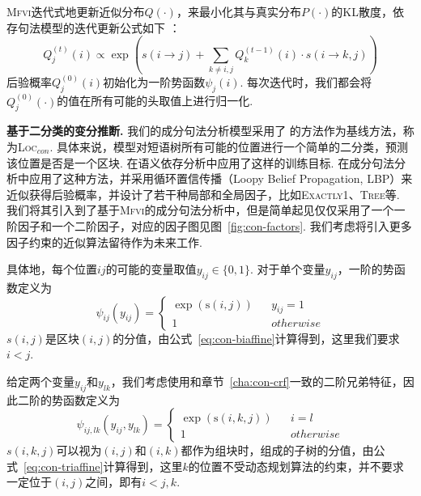 \textsc{Mfvi}迭代式地更新近似分布$Q(\cdot)$，来最小化其与真实分布$P(\cdot)$的KL散度，依存句法模型的迭代更新公式如下 \citep{wang-tu-2020-second}：
\begin{equation}
  \label{eq:mfvi-dep}
  Q_{j}^{(t)}(i)\propto \exp\left(s(i\rightarrow j) +\sum_{k\neq i,j} Q_{k}^{(t-1)}(i)\cdot s(i\rightarrow {k,j}) \right)
\end{equation}
后验概率$Q_j^{(0)}(i)$初始化为一阶势函数$\psi_j(i)$.
每次迭代时，我们都会将$Q_j^{(0)}(\cdot)$的值在所有可能的头取值上进行归一化.

\noindent\textbf{基于二分类的变分推断.}
我们的成分句法分析模型采用了 \citep{gaddy-etal-2018-whats}的方法作为基线方法，称为\textsc{Loc}$_{con}$.
具体来说，模型对短语树所有可能的位置进行一个简单的二分类，预测该位置是否是一个区块.
\citep{dozat-manning-2018-simpler,wang-etal-2019-second}在语义依存分析中应用了这样的训练目标.
\citep{gormley-eisner-2015-structured,naradowsky-etal-2012-grammarless}在成分句法分析中应用了这种方法，并采用循环置信传播（Loopy Belief Propagation, LBP）来近似获得后验概率，并设计了若干种局部和全局因子，比如\textsc{Exactly1}、\textsc{Tree}等.
我们将其引入到了基于\textsc{Mfvi}的成分句法分析中，但是简单起见仅仅采用了一个一阶因子和一个二阶因子，对应的因子图见图~\ref{fig:con-factors}.
我们考虑将引入更多因子约束的近似算法留待作为未来工作.


具体地，每个位置$ij$的可能的变量取值$y_{ij}\in \{0,1\}$. 对于单个变量$y_{ij}$，一阶的势函数定义为
\begin{equation}
  \label{eq:con-1o-potential}
  \psi_{ij}(y_{ij})=\left\{
  \begin{array}{rcl}
    \exp\left(\mathrm{s}(i,j)\right) &  & {y_{ij}=1}  \\
    1                                &  & {otherwise}
  \end{array}
  \right.
\end{equation}
$s(i,j)$是区块$(i,j)$的分值，由公式~\ref{eq:con-biaffine}计算得到，这里我们要求$i<j$.

给定两个变量$y_{ij}$和$y_{lk}$，我们考虑使用和章节~\ref{cha:con-crf}一致的二阶兄弟特征，因此二阶的势函数定义为
\begin{equation}
  \label{eq:2o-con-potential}
  \psi_{ij,lk}(y_{ij},y_{lk})=\left\{
  \begin{array}{rcl}
    \exp\left(\mathrm{s}(i,k,j)\right) &  & {i=l}       \\
    1                                  &  & {otherwise}
  \end{array}
  \right.
\end{equation}
$s(i,k,j)$可以视为$(i,j)$和$(i,k)$都作为组块时，组成的子树的分值，由公式~\ref{eq:con-triaffine}计算得到，这里$k$的位置不受动态规划算法的约束，并不要求一定位于$(i,j)$之间，即有$i<j,k$.

